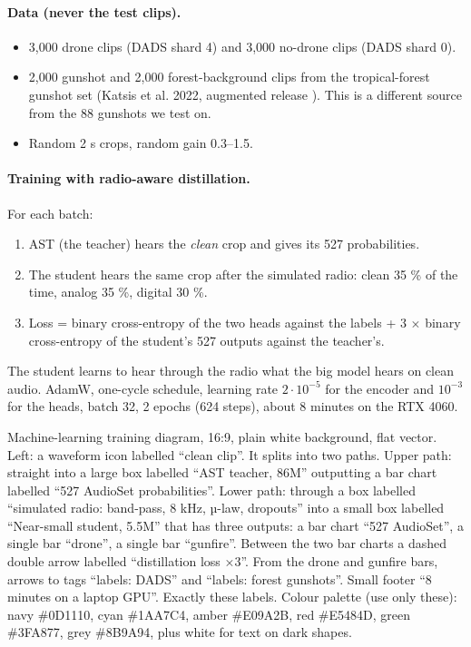 \paragraph{Data (never the test clips).}
\begin{itemize}
  \item 3,000 drone clips (DADS shard 4) and 3,000 no-drone clips (DADS shard 0).
  \item 2,000 gunshot and 2,000 forest-background clips from the tropical-forest gunshot set (Katsis et al. 2022, augmented
        release ). This is a different source from the 88 gunshots we test on.
  \item Random 2 s crops, random gain 0.3--1.5.
\end{itemize}

\paragraph{Training with radio-aware distillation.} For each batch:
\begin{enumerate}
  \item AST (the teacher) hears the \emph{clean} crop and gives its 527 probabilities.
  \item The student hears the same crop after the simulated radio: clean 35 \% of the time, analog 35 \%, digital 30 \%.
  \item Loss = binary cross-entropy of the two heads against the labels + 3 $\times$ binary cross-entropy of the student's
        527 outputs against the teacher's.
\end{enumerate}
The student learns to hear through the radio what the big model hears on clean audio. AdamW, one-cycle schedule, learning
rate $2\cdot10^{-5}$ for the encoder and $10^{-3}$ for the heads, batch 32, 2 epochs (624 steps), about 8 minutes on the
RTX 4060.

{Machine-learning training diagram, 16:9, plain white background, flat vector. Left: a waveform icon labelled ``clean clip''. It
splits into two paths. Upper path: straight into a large box labelled ``AST teacher, 86M'' outputting a bar chart labelled
``527 AudioSet probabilities''. Lower path: through a box labelled ``simulated radio: band-pass, 8 kHz, µ-law, dropouts'' into a
small box labelled ``Near-small student, 5.5M'' that has three outputs: a bar chart ``527 AudioSet'', a single bar ``drone'', a
single bar ``gunfire''. Between the two bar charts a dashed double arrow labelled ``distillation loss ×3''. From the drone and
gunfire bars, arrows to tags ``labels: DADS'' and ``labels: forest gunshots''. Small footer ``8 minutes on a laptop GPU''.
Exactly these labels. Colour palette (use only these): navy \#0D1110, cyan \#1AA7C4, amber \#E09A2B, red \#E5484D, green \#3FA877, grey \#8B9A94, plus white for text on dark shapes.}

